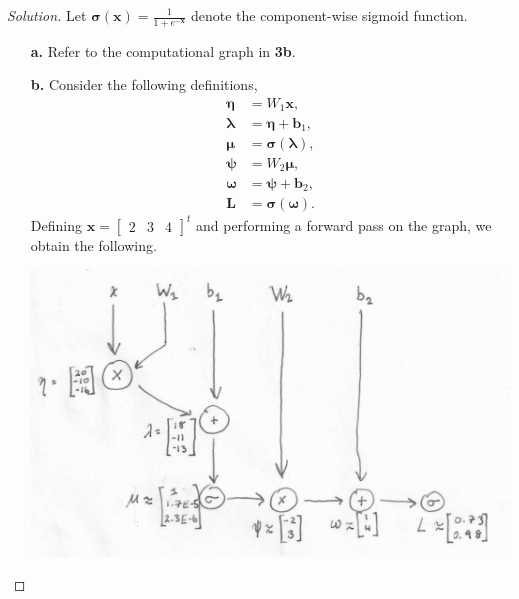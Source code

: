 \documentclass[ 12pt ]{article}
\begin{document}
\begin{enumerate}
		\begin{proof}[Solution]
			Let $\pmb{\sigma}(\textbf{x}) = \frac{1}{1 + e^{-\textbf{x}}}$ denote the component-wise sigmoid function.
			\begin{enumerate}
				\item[\textbf{a.}] Refer to the computational graph in \textbf{3b}.

				\item[\textbf{b.}] Consider the following definitions,
					\begin{align*}
						\pmb{\eta} &= W_1 \textbf{x}, \\
						\pmb{\lambda} &= \pmb{\eta} + \textbf{b}_1, \\
						\pmb{\mu} &= \pmb{\sigma}(\pmb{\lambda}), \\
						\pmb{\psi} &= W_2 \pmb{\mu}, \\
						\pmb{\omega} &= \pmb{\psi} + \textbf{b}_2, \\
						\textbf{L} &= \pmb{\sigma}(\pmb{\omega}).
					\end{align*}
					Defining $\textbf{x} = \begin{bmatrix} 2 & 3 & 4 \end{bmatrix}^t$ and performing a forward pass on the graph, we obtain the following.
					\begin{center}
						\includegraphics{capture}
					\end{center}


\end{enumerate}
\end{proof}
\end{enumerate}
\end{document}
